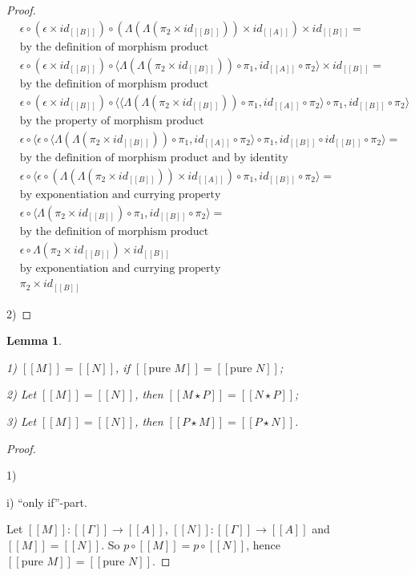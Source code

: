 \documentclass[a4paper]{article}
\newtheorem{lemma}{Lemma}
\begin{document}
\begin{proof}
$\begin{array}{lll}
&\epsilon \circ (\epsilon \times id_{[\![B]\!]}) \circ (\Lambda(\Lambda(\pi_2 \times id_{[\![B]\!]})) \times id_{[\![A]\!]}) \times id_{[\![B]\!]} =&\\
&\text{by the definition of morphism product}&\\
&\epsilon \circ (\epsilon \times id_{[\![B]\!]}) \circ \langle \Lambda(\Lambda(\pi_2 \times id_{[\![B]\!]})) \circ \pi_1, id_{[\![A]\!]} \circ \pi_2 \rangle \times id_{[\![B]\!]} = & \\
&\text{by the definition of morphism product}& \\
&\epsilon \circ (\epsilon \times id_{[\![B]\!]}) \circ \langle \langle \Lambda(\Lambda(\pi_2 \times
id_{[\![B]\!]})) \circ \pi_1, id_{[\![A]\!]} \circ \pi_2 \rangle \circ \pi_1, id_{[\![B]\!]} \circ \pi_2
\rangle & \\
&\text{by the property of morphism product}& \\
&\epsilon \circ \langle \epsilon \circ \langle \Lambda(\Lambda(\pi_2 \times id_{[\![B]\!]})) \circ \pi_1,
id_{[\![A]\!]} \circ \pi_2 \rangle \circ \pi_1, id_{[\![B]\!]} \circ id_{[\![B]\!]} \circ \pi_2 \rangle = &\\
&\text{by the definition of morphism product and by identity}& \\
&\epsilon \circ \langle \epsilon \circ (\Lambda(\Lambda(\pi_2 \times id_{[\![B]\!]})) \times id_{[\![A]\!]})
\circ \pi_1, id_{[\![B]\!]} \circ \pi_2 \rangle = & \\
&\text{by exponentiation and currying property}& \\
&\epsilon \circ \langle \Lambda(\pi_2 \times id_{[\![B]\!]}) \circ \pi_1, id_{[\![B]\!]} \circ \pi_2 \rangle
= & \\
&\text{by the definition of morphism product}&\\
&\epsilon \circ \Lambda(\pi_2 \times id_{[\![B]\!]}) \times id_{[\![B]\!]} & \\
&\text{by exponentiation and currying property}& \\
&\pi_2 \times id_{[\![B]\!]}&
\end{array}$

\vspace{\baselineskip}

2)

\end{proof}

\begin{lemma}
$ $

1) $[\![M]\!] = [\![N]\!]$, if $[\![\text{pure }  M]\!] = [\![\text{pure } N]\!]$;

2) Let $[\![M]\!] = [\![N]\!]$, then $[\![M \star P]\!] = [\![N \star P]\!]$;

3) Let $[\![M]\!] = [\![N]\!]$, then $[\![P \star M]\!] = [\![P \star N]\!]$.
\end{lemma}

\begin{proof}

$ $

1)

i) ``only if''-part.

Let $[\![M]\!] : [\![\Gamma]\!] \to [\![A]\!]$, $[\![N]\!] : [\![\Gamma]\!] \to [\![A]\!]$ and $[\![M]\!] =
[\![N]\!]$. So $p \circ [\![M]\!] = p \circ [\![N]\!]$, hence $[\![\text{pure } M]\!] = [\![\text{pure }
N]\!]$.


\end{proof}
\end{document}
